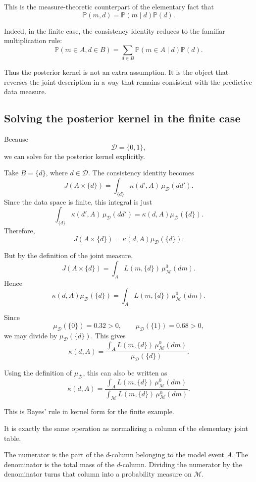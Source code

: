 \documentclass[11pt]{article}
\newcommand{\M}{\mathcal{M}}
\newcommand{\D}{\mathcal{D}}
\newcommand{\muMzero}{\mu^0_{\M}}
\newcommand{\muD}{\mu_{\D}}
\begin{document}
This is the measure-theoretic counterpart of the elementary fact that
\[
    \mathbb{P}(m,d)
    =
    \mathbb{P}(m\mid d)\mathbb{P}(d).
\]

Indeed, in the finite case, the consistency identity reduces to the familiar multiplication rule:
\[
    \mathbb{P}(m\in A,d\in B)
    =
    \sum_{d\in B}
    \mathbb{P}(m\in A\mid d)\mathbb{P}(d).
\]

Thus the posterior kernel is not an extra assumption. It is the object that reverses the joint description in a way that remains consistent with the predictive data measure.

\subsection{Solving the posterior kernel in the finite case}

Because
\[
    \D=\{0,1\},
\]
we can solve for the posterior kernel explicitly.

Take \(B=\{d\}\), where \(d\in\D\). The consistency identity becomes
\[
    J(A\times\{d\})
    =
    \int_{\{d\}} \kappa(d',A)\,\muD(dd').
\]
Since the data space is finite, this integral is just
\[
    \int_{\{d\}} \kappa(d',A)\,\muD(dd')
    =
    \kappa(d,A)\muD(\{d\}).
\]
Therefore,
\[
    J(A\times\{d\})
    =
    \kappa(d,A)\muD(\{d\}).
\]

But by the definition of the joint measure,
\[
    J(A\times\{d\})
    =
    \int_A L(m,\{d\})\,\muMzero(dm).
\]
Hence
\[
    \kappa(d,A)\muD(\{d\})
    =
    \int_A L(m,\{d\})\,\muMzero(dm).
\]

Since
\[
    \muD(\{0\})=0.32>0,
    \qquad
    \muD(\{1\})=0.68>0,
\]
we may divide by \(\muD(\{d\})\). This gives
\[
    \kappa(d,A)
    =
    \frac{
        \int_A L(m,\{d\})\,\muMzero(dm)
    }{
        \muD(\{d\})
    }.
\]

Using the definition of \(\muD\), this can also be written as
\[
    \kappa(d,A)
    =
    \frac{
        \int_A L(m,\{d\})\,\muMzero(dm)
    }{
        \int_{\M} L(m,\{d\})\,\muMzero(dm)
    }.
\]

This is Bayes' rule in kernel form for the finite example.

It is exactly the same operation as normalizing a column of the elementary joint table.

The numerator is the part of the \(d\)-column belonging to the model event \(A\). The denominator is the total mass of the \(d\)-column. Dividing the numerator by the denominator turns that column into a probability measure on \(\M\).
\end{document}
